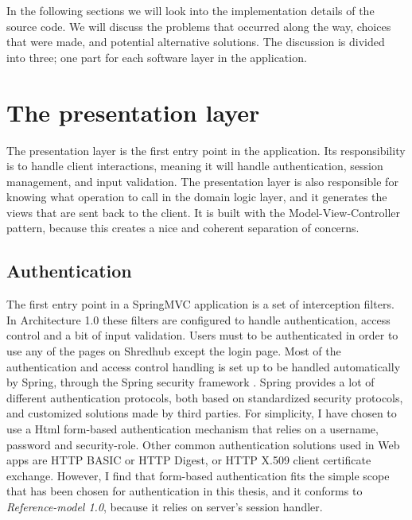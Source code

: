 In the following sections we will look into the implementation details of the source code. We will discuss the problems that occurred along the way, choices that were made, and potential alternative solutions. The discussion is divided into three; one part for each software layer in the application.

\section{The presentation layer}
The presentation layer is the first entry point in the application. Its responsibility is to handle client interactions, meaning it will handle authentication, session management, and input validation. The presentation layer is also responsible for knowing what operation to call in the domain logic layer, and it generates the views that are sent back to the client. It is built with the Model-View-Controller pattern, because this creates a nice and coherent separation of concerns. 

\subsection{Authentication}
The first entry point in a SpringMVC application is a set of interception filters. In Architecture 1.0 these filters are configured to handle authentication, access control and a bit of input validation. Users must to be authenticated in order to use any of the pages on Shredhub except the login page. Most of the authentication and access control handling is set up to be handled automatically by Spring, through the Spring security framework \cite{springsec}. Spring provides a lot of different authentication protocols, both based on standardized security protocols, and customized solutions made by third parties. For simplicity, I have chosen to use a Html form-based authentication mechanism that relies on a username, password and security-role. Other common authentication solutions used in Web apps are HTTP BASIC or HTTP Digest, or HTTP X.509 client certificate exchange. However, I find that form-based authentication fits the simple scope that has been chosen for authentication in this thesis, and it conforms to \textit{Reference-model 1.0}, because it relies on server's session handler.

